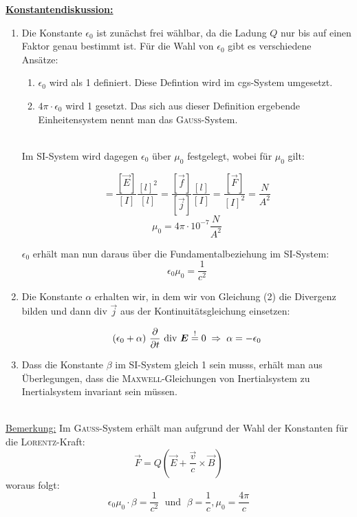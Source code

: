 \underline{\textbf{Konstantendiskussion:}}
\ \\
\begin{enumerate}
	\item Die Konstante $\epsilon_0$ ist zunächst frei wählbar, da die Ladung $Q$ nur bis auf einen Faktor genau bestimmt ist. Für die Wahl von $\epsilon_0$ gibt es verschiedene Ansätze:\
	\begin{enumerate}
		\item $\epsilon_0$ wird als 1 definiert. Diese Defintion wird im cgs-System umgesetzt.\
		\\
		\item $4\pi\cdot\epsilon_0$ wird 1 gesetzt. Das sich aus dieser Definition ergebende Einheitensystem nennt man das \textsc{Gauss}-System.\
	\end{enumerate}
	\ \\
	Im SI-System wird dagegen $\epsilon_0$ über $\mu_0$ festgelegt, wobei für $\mu_0$ gilt:
	
	\begin{equation*}
	[\mu_0] = \frac{[\vec{E}]}{[I]}\frac{[l]^2}{[l]}=\frac{[\vec{f}]}{[\vec{j}]}\frac{[l]}{[I]}=\frac{[\vec{F}]}{[I]^2}=\frac{N}{A^2}
	\end{equation*}
	\begin{equation*}
	\mu_0 = 4\pi\cdot 10^{-7} \frac{N}{A^2}
	\end{equation*}
	
	$\epsilon_0$ erhält man nun daraus über die Fundamentalbeziehung im SI-System:
	\begin{equation*}
	\epsilon_0\mu_0 = \frac{1}{c^2}
	\end{equation*}
	
	\item
	Die Konstante $\alpha$ erhalten wir, in dem wir von Gleichung (2) die Divergenz bilden und dann div $\vec{j}$ aus der Kontinuitätsgleichung einsetzen:
	
	\begin{equation*}
	(\epsilon_0 + \alpha) \ \pdiff{}{t} \ \div \vec{E} \overset{!}{=} 0 \; \Rightarrow \; \alpha = -\epsilon_0 
	\end{equation*}
	
	\item
	Dass die Konstante $\beta$ im SI-System gleich 1 sein musss, erhält man aus Überlegungen, dass die \textsc{Maxwell}-Gleichungen von Inertialsystem zu Inertialsystem invariant sein müssen.
\end{enumerate}
\ \\
\underline{Bemerkung:}
Im \textsc{Gauss}-System erhält man aufgrund der Wahl der Konstanten für die \textsc{Lorentz}-Kraft:
\begin{equation*}
\vec{F} = Q (\vec{E} + \frac{\vec{v}}{c}\times\vec{B})
\end{equation*}
woraus folgt:
\begin{equation*}
\epsilon_0\mu_0\cdot\beta = \frac{1}{c^2} \; \text{ und } \; \beta = \frac{1}{c}, \mu_0 = \frac{4\pi}{c}
\end{equation*}

